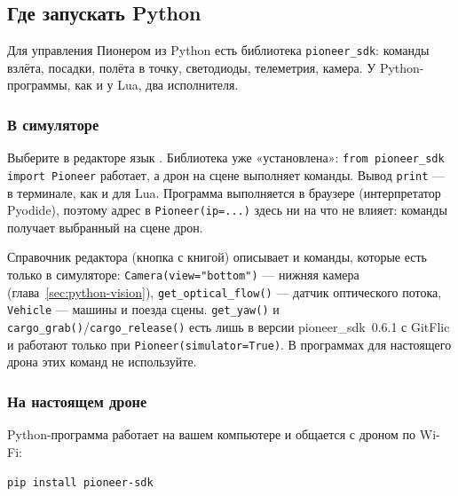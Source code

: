 \subsection{Где запускать Python}

Для управления Пионером из Python есть библиотека \texttt{pioneer\_sdk}: команды взлёта, посадки, полёта в точку, светодиоды, телеметрия, камера. У Python-программы, как и у Lua, два исполнителя.

\subsubsection*{В симуляторе}

Выберите в редакторе язык . Библиотека уже «установлена»: \verb|from pioneer_sdk import Pioneer| работает, а дрон на сцене выполняет команды. Вывод \verb|print| --- в терминале, как и для Lua. Программа выполняется в браузере (интерпретатор Pyodide), поэтому адрес в \verb|Pioneer(ip=...)| здесь ни на что не влияет: команды получает выбранный на сцене дрон.

\begin{infobox}
Справочник редактора (кнопка с книгой) описывает и команды, которые есть только в симуляторе: \verb|Camera(view="bottom")| --- нижняя камера (глава~\ref{sec:python-vision}), \verb|get_optical_flow()| --- датчик оптического потока, \verb|Vehicle| --- машины и поезда сцены. \verb|get_yaw()| и \verb|cargo_grab()|/\verb|cargo_release()| есть лишь в версии pioneer\_sdk~0.6.1 с GitFlic и работают только при \verb|Pioneer(simulator=True)|. В программах для настоящего дрона этих команд не используйте.
\end{infobox}

\begin{center}
\end{center}

\subsubsection*{На настоящем дроне}

Python-программа работает на вашем компьютере и общается с дроном по Wi-Fi:

\begin{codebox}[Терминал]
\texttt{pip install pioneer-sdk}
\end{codebox}

